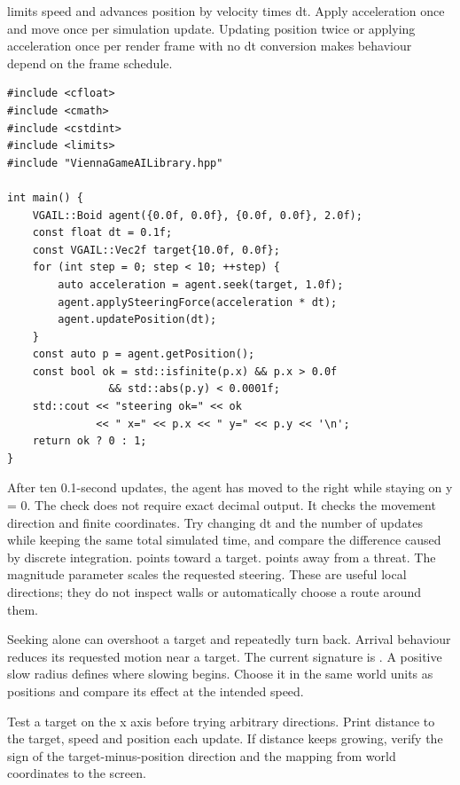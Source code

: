 \documentclass[11pt,a4paper]{article}
\begin{document}
 limits speed and advances position by velocity times dt. Apply acceleration once and move once per simulation update. Updating position twice or applying acceleration once per render frame with no dt conversion makes behaviour depend on the frame schedule.
\begin{lstlisting}
#include <cfloat>
#include <cmath>
#include <cstdint>
#include <limits>
#include "ViennaGameAILibrary.hpp"

int main() {
    VGAIL::Boid agent({0.0f, 0.0f}, {0.0f, 0.0f}, 2.0f);
    const float dt = 0.1f;
    const VGAIL::Vec2f target{10.0f, 0.0f};
    for (int step = 0; step < 10; ++step) {
        auto acceleration = agent.seek(target, 1.0f);
        agent.applySteeringForce(acceleration * dt);
        agent.updatePosition(dt);
    }
    const auto p = agent.getPosition();
    const bool ok = std::isfinite(p.x) && p.x > 0.0f
                && std::abs(p.y) < 0.0001f;
    std::cout << "steering ok=" << ok
              << " x=" << p.x << " y=" << p.y << '\n';
    return ok ? 0 : 1;
}
\end{lstlisting}
After ten 0.1-second updates, the agent has moved to the right while staying on y = 0. The check does not require exact decimal output. It checks the movement direction and finite coordinates. Try changing dt and the number of updates while keeping the same total simulated time, and compare the difference caused by discrete integration.
 points toward a target.  points away from a threat. The magnitude parameter scales the requested steering. These are useful local directions; they do not inspect walls or automatically choose a route around them.

Seeking alone can overshoot a target and repeatedly turn back. Arrival behaviour reduces its requested motion near a target. The current signature is . A positive slow radius defines where slowing begins. Choose it in the same world units as positions and compare its effect at the intended speed.

Test a target on the x axis before trying arbitrary directions. Print distance to the target, speed and position each update. If distance keeps growing, verify the sign of the target-minus-position direction and the mapping from world coordinates to the screen.
\end{document}
